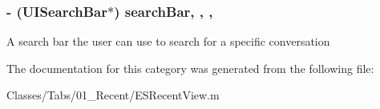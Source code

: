 \subsubsection[{search\+Bar}]{\setlength{\rightskip}{0pt plus 5cm}-\/ (U\+I\+Search\+Bar$\ast$) search\+Bar\hspace{0.3cm}{\ttfamily [read]}, {\ttfamily [write]}, {\ttfamily [nonatomic]}, {\ttfamily [strong]}}\label{category_e_s_recent_view_07_08_a5691c509462de8746726d7ffa92b4a1d}
A search bar the user can use to search for a specific conversation 

The documentation for this category was generated from the following file\+:\begin{DoxyCompactItemize}
\item 
Classes/\+Tabs/01\+\_\+\+Recent/E\+S\+Recent\+View.\+m\end{DoxyCompactItemize}
